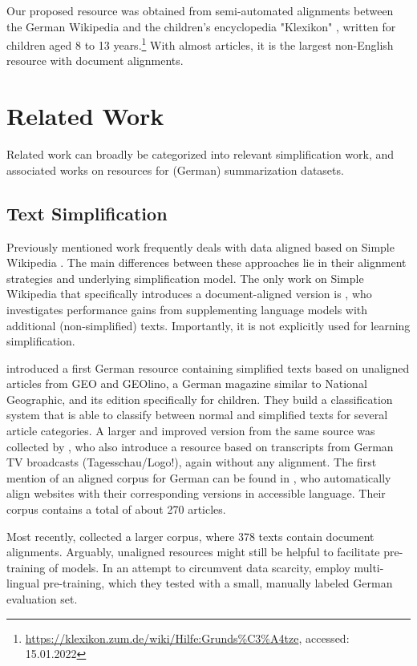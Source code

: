 \documentclass[10pt, a4paper]{article}
\begin{document}
Our proposed resource was obtained from semi-automated alignments between the German Wikipedia and the children's encyclopedia "Klexikon" \cite{schulte-dijk-2015-free}, written for children aged 8 to 13 years.\footnote{\url{https://klexikon.zum.de/wiki/Hilfe:Grunds\%C3\%A4tze}, accessed: 15.01.2022}
With almost  articles, it is the largest non-English resource with document alignments.






\section{Related Work}
Related work can broadly be categorized into relevant simplification work, and associated works on resources for (German) summarization datasets.

\subsection{Text Simplification}
Previously mentioned work frequently deals with data aligned based on Simple Wikipedia \cite{zhu-etal-2010-monolingual,coster-kauchak-2011-simple,hwang-etal-2015-aligning}. The main differences between these approaches lie in their alignment strategies and underlying simplification model.
The only work on Simple Wikipedia that specifically introduces a document-aligned version is \cite{kauchak-2013-improving}, who investigates performance gains from supplementing language models with additional (non-simplified) texts. Importantly, it is not explicitly used for learning simplification.


\cite{hancke-etal-2012-readability} introduced a first German resource containing simplified texts based on unaligned articles from GEO and GEOlino, a German magazine similar to National Geographic, and its edition specifically for children.
They build a classification system that is able to classify between normal and simplified texts for several article categories.
A larger and improved version from the same source was collected by \cite{weiss-meurers-2018-modeling}, who also introduce a resource based on transcripts from German TV broadcasts (Tagesschau/Logo!), again without any alignment.
The first mention of an aligned corpus for German can be found in \cite{klaper-etal-2013-building}, who automatically align websites with their corresponding versions in accessible language. Their corpus contains a total of about 270 articles.

Most recently, \cite{battisti-etal-2020-corpus} collected a larger corpus, where 378 texts contain document alignments. Arguably, unaligned resources might still be helpful to facilitate pre-training of models.
In an attempt to circumvent data scarcity, \cite{mallinson-etal-2020-zero} employ multi-lingual pre-training, which they tested with a small, manually labeled German evaluation set.
\end{document}
